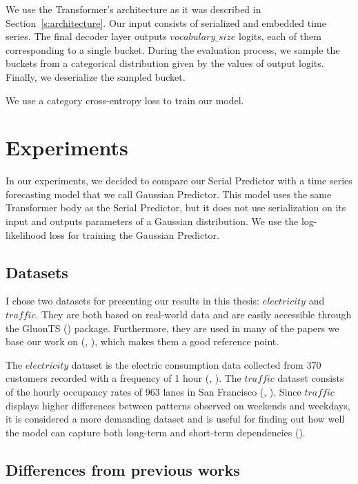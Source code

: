 \documentclass[en]{pracamgr}
\begin{document}
	We use the Transformer's architecture as it was described in Section~\ref{s:architecture}. Our input consists of serialized and embedded time series. The final decoder layer outputs $vocabulary\_size$ logits, each of them corresponding to a single bucket. During the evaluation process, we sample the buckets from a categorical distribution given by the values of output logits. Finally, we deserialize the sampled bucket.
	
	We use a category cross-entropy loss to train our model.
	
	
	
	\chapter{Experiments}
	
	In our experiments, we decided to compare our Serial Predictor with a time series forecasting model that we call Gaussian Predictor. This model uses the same Transformer body as the Serial Predictor, but it does not use serialization on its input and outputs parameters of a Gaussian distribution. We use the log-likelihood loss for training the Gaussian Predictor.
	
	\section{Datasets}
	
	I chose two datasets for presenting our results in this thesis: $electricity$ and $traffic$. They are both based on real-world data and are easily accessible through the GluonTS (\cite{gluonts}) package. Furthermore, they are used in many of the papers we base our work on (\cite{enhancing}, \cite{deepar}), which makes them a good reference point.
	
	The $electricity$ dataset is the electric consumption data collected from 370 customers recorded with a frequency of 1 hour (\cite{enhancing}, \cite{deepar}). The $traffic$ dataset consists of the hourly occupancy rates of 963 lanes in San Francisco (\cite{enhancing}, \cite{deepar}). Since $traffic$ displays higher differences between patterns observed on weekends and weekdays, it is considered a more demanding dataset and is useful for finding out how well the model can capture both long-term and short-term dependencies (\cite{enhancing}).
	
	
	
	\section{Differences from previous works}\label{s:diff}
	
\end{document}
